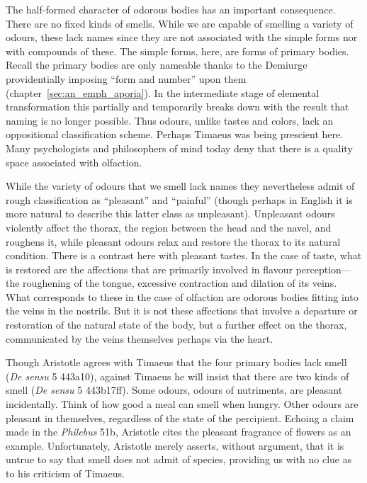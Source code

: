 The half-formed character of odorous bodies has an important consequence. There are no fixed kinds of smells. While we are capable of smelling a variety of odours, these lack names since they are not associated with the simple forms nor with compounds of these. The simple forms, here, are forms of primary bodies. Recall the primary bodies are only nameable thanks to the Demiurge providentially imposing ``form and number'' upon them (chapter~\ref{sec:an_emph_aporia}). In the intermediate stage of elemental transformation this partially and temporarily breaks down with the result that naming is no longer possible. Thus odours, unlike tastes and colors, lack an oppositional classification scheme. Perhaps Timaeus was being prescient here. Many psychologists and philosophers of mind today deny that there is a quality space associated with olfaction.

While the variety of odours that we smell lack names they nevertheless admit of rough classification as ``pleasant'' and ``painful'' (though perhaps in English it is more natural to describe this latter class as unpleasant). Unpleasant odours violently affect the thorax, the region between the head and the navel, and roughens it, while pleasant odours relax and restore the thorax to its natural condition. There is a contrast here with pleasant tastes. In the case of taste, what is restored are the affections that are primarily involved in flavour perception---the roughening of the tongue, excessive contraction and dilation of its veins. What corresponds to these in the case of olfaction are odorous bodies fitting into the veins in the nostrils. But it is not these affections that involve a departure or restoration of the natural state of the body, but a further effect on the thorax, communicated by the veins themselves perhaps via the heart.

Though Aristotle agrees with Timaeus that the four primary bodies lack smell (\emph{De sensu} 5 443a10), against Timaeus he will insist that there are two kinds of smell (\emph{De sensu} 5 443b17ff). Some odours, odours of nutriments, are pleasant incidentally. Think of how good a meal can smell when hungry. Other odours are pleasant in themselves, regardless of the state of the percipient. Echoing a claim made in the \emph{Philebus} 51b, Aristotle cites the pleasant fragrance of flowers as an example. Unfortunately, Aristotle merely asserts, without argument, that it is untrue to say that smell does not admit of species, providing us with no clue as to his criticism of Timaeus. 

